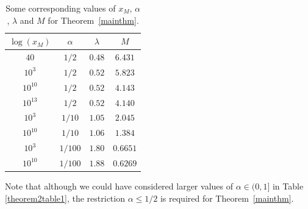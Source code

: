 \documentclass[reqno]{amsart}
\numberwithin{equation}{section}
\theoremstyle{remark}
\begin{document}
\def\arraystretch{1.5}
\begin{table}[h]
\centering
\caption{Some corresponding values of $x_M$, $\alpha$, $\lambda$ and $M$ for Theorem~\ref{mainthm}.}
\begin{tabular}{|c|c|c|c|}
\hline
$\log(x_M)$ & $\alpha$ & $\lambda$ & $M$\\
\hline
$40$ & $1/2$ & $0.48$ & $6.431$\\
\hline
$10^3$ & $1/2$ & $0.52$ & $5.823$\\
\hline
$10^{10}$ & $1/2$ & $0.52$ & $4.143$\\
\hline
$10^{13}$ & $1/2$ & $0.52$ & $4.140$\\
\hline
$10^3$ & $1/10$ & $1.05$ & $2.045$\\
\hline
$10^{10}$ & $1/10$ & $1.06$ & $1.384$\\
\hline
$10^3$ & $1/100$ & $1.80$ & $0.6651$\\
\hline
$10^{10}$ & $1/100$ & $1.88$ & $0.6269$\\
\hline
\end{tabular}
\label{maintable}
\end{table}


Note that although we could have considered larger values of $\alpha\in(0,1]$ in Table \ref{theorem2table1}, the restriction $\alpha\leq 1/2$ is required for Theorem~\ref{mainthm}.

\newpage

\printbibliography
\end{document}
